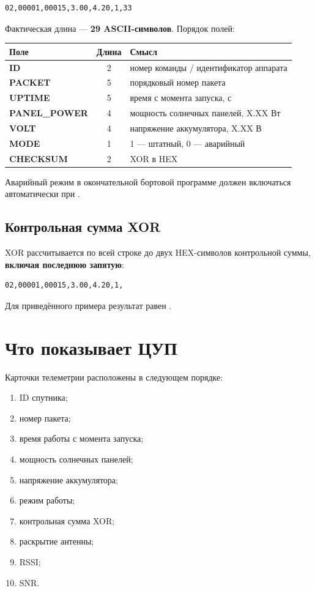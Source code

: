 \documentclass[11pt,a4paper]{article}
\newcommand{\code}[1]{\texttt{\detokenize{#1}}}
\begin{document}
\begin{lstlisting}
02,00001,00015,3.00,4.20,1,33
\end{lstlisting}

Фактическая длина — \textbf{29 ASCII-символов}. Порядок полей:

\begin{center}
\begin{tabularx}{\linewidth}{>{\bfseries}l c X}
\toprule
Поле & Длина & Смысл\\
\midrule
ID & 2 & номер команды / идентификатор аппарата\\
PACKET & 5 & порядковый номер пакета\\
UPTIME & 5 & время с момента запуска, с\\
PANEL\_POWER & 4 & мощность солнечных панелей, X.XX Вт\\
VOLT & 4 & напряжение аккумулятора, X.XX В\\
MODE & 1 & 1 — штатный, 0 — аварийный\\
CHECKSUM & 2 & XOR в HEX\\
\bottomrule
\end{tabularx}
\end{center}

Аварийный режим в окончательной бортовой программе должен включаться автоматически при \code{VOLT < 2.00 В}.

\subsection{Контрольная сумма XOR}

XOR рассчитывается по всей строке до двух HEX-символов контрольной суммы, \textbf{включая последнюю запятую}:

\begin{lstlisting}
02,00001,00015,3.00,4.20,1,
\end{lstlisting}

Для приведённого примера результат равен \code{0x33}.

\section{Что показывает ЦУП}

Карточки телеметрии расположены в следующем порядке:

\begin{enumerate}[leftmargin=7mm]
\item ID спутника;
\item номер пакета;
\item время работы с момента запуска;
\item мощность солнечных панелей;
\item напряжение аккумулятора;
\item режим работы;
\item контрольная сумма XOR;
\item раскрытие антенны;
\item RSSI;
\item SNR.
\end{enumerate}
\end{document}
